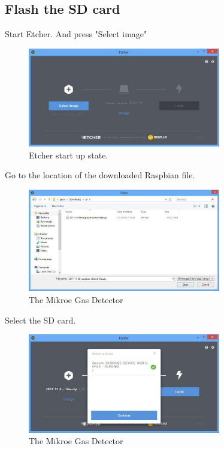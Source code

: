 \documentclass[11pt]{report}
\begin{document}
		\subsection{Flash the SD card}
			Start Etcher. And press "Select image"
			\begin{figure}[ht]
				\centering
				\includegraphics[width=0.75\textwidth]{images/pi/install_etcher_2.jpg} 
				\caption{Etcher start up state.}
			\end{figure}
			\newpage
			Go to the location of the downloaded Raspbian file.
			\begin{figure}[H]
				\centering
				\includegraphics[width=0.75\textwidth]{images/pi/install_etcher_3.jpg} 
				\caption{The Mikroe Gas Detector}
			\end{figure}
			Select the SD card.
			\begin{figure}[ht]
				\centering
				\includegraphics[width=0.75\textwidth]{images/pi/install_etcher_4.jpg} 
				\caption{The Mikroe Gas Detector}
			\end{figure}
\end{document}

